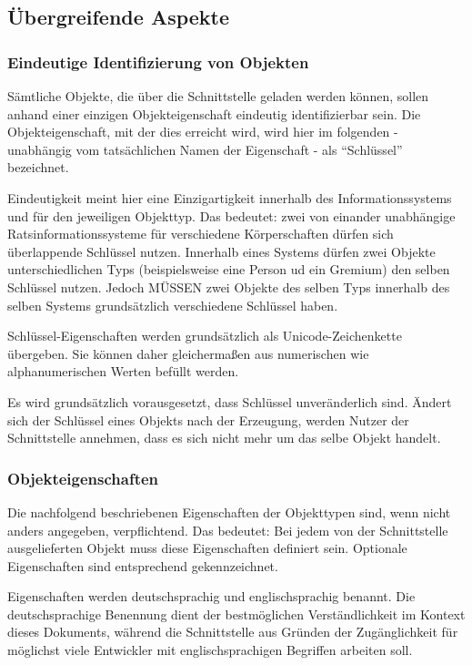 \documentclass[,a4paper]{article}
\begin{document}
\subsection{Übergreifende Aspekte}

\subsubsection{Eindeutige Identifizierung von Objekten}

Sämtliche Objekte, die über die Schnittstelle geladen werden können,
sollen anhand einer einzigen Objekteigenschaft eindeutig identifizierbar
sein. Die Objekteigenschaft, mit der dies erreicht wird, wird hier im
folgenden - unabhängig vom tatsächlichen Namen der Eigenschaft - als
``Schlüssel'' bezeichnet.

Eindeutigkeit meint hier eine Einzigartigkeit innerhalb des
Informationssystems und für den jeweiligen Objekttyp. Das bedeutet: zwei
von einander unabhängige Ratsinformationssysteme für verschiedene
Körperschaften dürfen sich überlappende Schlüssel nutzen. Innerhalb
eines Systems dürfen zwei Objekte unterschiedlichen Typs (beispielsweise
eine Person ud ein Gremium) den selben Schlüssel nutzen. Jedoch MÜSSEN
zwei Objekte des selben Typs innerhalb des selben Systems grundsätzlich
verschiedene Schlüssel haben.

Schlüssel-Eigenschaften werden grundsätzlich als Unicode-Zeichenkette
übergeben. Sie können daher gleichermaßen aus numerischen wie
alphanumerischen Werten befüllt werden.

Es wird grundsätzlich vorausgesetzt, dass Schlüssel unveränderlich sind.
Ändert sich der Schlüssel eines Objekts nach der Erzeugung, werden
Nutzer der Schnittstelle annehmen, dass es sich nicht mehr um das selbe
Objekt handelt.

\subsubsection{Objekteigenschaften}

Die nachfolgend beschriebenen Eigenschaften der Objekttypen sind, wenn
nicht anders angegeben, verpflichtend. Das bedeutet: Bei jedem von der
Schnittstelle ausgelieferten Objekt muss diese Eigenschaften definiert
sein. Optionale Eigenschaften sind entsprechend gekennzeichnet.

Eigenschaften werden deutschsprachig und englischsprachig benannt. Die
deutschsprachige Benennung dient der bestmöglichen Verständlichkeit im
Kontext dieses Dokuments, während die Schnittstelle aus Gründen der
Zugänglichkeit für möglichst viele Entwickler mit englischsprachigen
Begriffen arbeiten soll.
\end{document}
